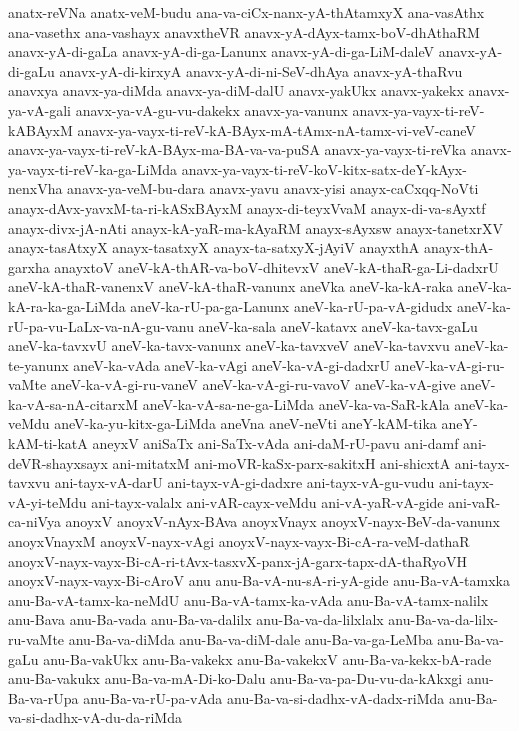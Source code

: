 {anatx-reVNa
anatx-veM-budu
ana-va-ciCx-nanx-yA-thAtamxyX
ana-vasAthx
ana-vasethx
ana-vashayx
anavxtheVR
anavx-yA-dAyx-tamx-boV-dhAthaRM
anavx-yA-di-gaLa
anavx-yA-di-ga-Lanunx
anavx-yA-di-ga-LiM-daleV
anavx-yA-di-gaLu
anavx-yA-di-kirxyA
anavx-yA-di-ni-SeV-dhAya
anavx-yA-thaRvu
anavxya
anavx-ya-diMda
anavx-ya-diM-dalU
anavx-yakUkx
anavx-yakekx
anavx-ya-vA-gali
anavx-ya-vA-gu-vu-dakekx
anavx-ya-vanunx
anavx-ya-vayx-ti-reV-kABAyxM
anavx-ya-vayx-ti-reV-kA-BAyx-mA-tAmx-nA-tamx-vi-veV-caneV
anavx-ya-vayx-ti-reV-kA-BAyx-ma-BA-va-va-puSA
anavx-ya-vayx-ti-reVka
anavx-ya-vayx-ti-reV-ka-ga-LiMda
anavx-ya-vayx-ti-reV-koV-kitx-satx-deY-kAyx-nenxVha
anavx-ya-veM-bu-dara
anavx-yavu
anavx-yisi
anayx-caCxqq-NoVti
anayx-dAvx-yavxM-ta-ri-kASxBAyxM
anayx-di-teyxVvaM
anayx-di-va-sAyxtf
anayx-divx-jA-nAti
anayx-kA-yaR-ma-kAyaRM
anayx-sAyxsw
anayx-tanetxrXV
anayx-tasAtxyX
anayx-tasatxyX
anayx-ta-satxyX-jAyiV
anayxthA
anayx-thA-garxha
anayxtoV
aneV-kA-thAR-va-boV-dhitevxV
aneV-kA-thaR-ga-Li-dadxrU
aneV-kA-thaR-vanenxV
aneV-kA-thaR-vanunx
aneVka
aneV-ka-kA-raka
aneV-ka-kA-ra-ka-ga-LiMda
aneV-ka-rU-pa-ga-Lanunx
aneV-ka-rU-pa-vA-gidudx
aneV-ka-rU-pa-vu-LaLx-va-nA-gu-vanu
aneV-ka-sala
aneV-katavx
aneV-ka-tavx-gaLu
aneV-ka-tavxvU
aneV-ka-tavx-vanunx
aneV-ka-tavxveV
aneV-ka-tavxvu
aneV-ka-te-yanunx
aneV-ka-vAda
aneV-ka-vAgi
aneV-ka-vA-gi-dadxrU
aneV-ka-vA-gi-ru-vaMte
aneV-ka-vA-gi-ru-vaneV
aneV-ka-vA-gi-ru-vavoV
aneV-ka-vA-give
aneV-ka-vA-sa-nA-citarxM
aneV-ka-vA-sa-ne-ga-LiMda
aneV-ka-va-SaR-kAla
aneV-ka-veMdu
aneV-ka-yu-kitx-ga-LiMda
aneVna
aneV-neVti
aneY-kAM-tika
aneY-kAM-ti-katA
aneyxV
aniSaTx
ani-SaTx-vAda
ani-daM-rU-pavu
ani-damf
ani-deVR-shayxsayx
ani-mitatxM
ani-moVR-kaSx-parx-sakitxH
ani-shicxtA
ani-tayx-tavxvu
ani-tayx-vA-darU
ani-tayx-vA-gi-dadxre
ani-tayx-vA-gu-vudu
ani-tayx-vA-yi-teMdu
ani-tayx-valalx
ani-vAR-cayx-veMdu
ani-vA-yaR-vA-gide
ani-vaR-ca-niVya
anoyxV
anoyxV-nAyx-BAva
anoyxVnayx
anoyxV-nayx-BeV-da-vanunx
anoyxVnayxM
anoyxV-nayx-vAgi
anoyxV-nayx-vayx-Bi-cA-ra-veM-dathaR
anoyxV-nayx-vayx-Bi-cA-ri-tAvx-tasxvX-panx-jA-garx-tapx-dA-thaRyoVH
anoyxV-nayx-vayx-Bi-cAroV
anu
anu-Ba-vA-nu-sA-ri-yA-gide
anu-Ba-vA-tamxka
anu-Ba-vA-tamx-ka-neMdU
anu-Ba-vA-tamx-ka-vAda
anu-Ba-vA-tamx-nalilx
anu-Bava
anu-Ba-vada
anu-Ba-va-dalilx
anu-Ba-va-da-lilxlalx
anu-Ba-va-da-lilx-ru-vaMte
anu-Ba-va-diMda
anu-Ba-va-diM-dale
anu-Ba-va-ga-LeMba
anu-Ba-va-gaLu
anu-Ba-vakUkx
anu-Ba-vakekx
anu-Ba-vakekxV
anu-Ba-va-kekx-bA-rade
anu-Ba-vakukx
anu-Ba-va-mA-Di-ko-Dalu
anu-Ba-va-pa-Du-vu-da-kAkxgi
anu-Ba-va-rUpa
anu-Ba-va-rU-pa-vAda
anu-Ba-va-si-dadhx-vA-dadx-riMda
anu-Ba-va-si-dadhx-vA-du-da-riMda
}
